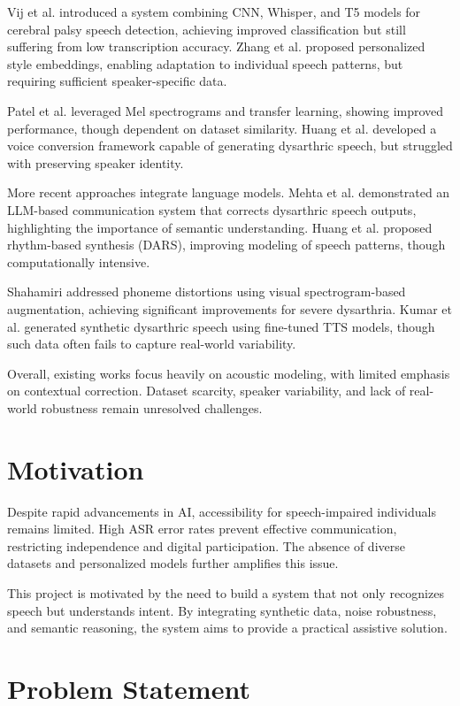 Vij et al. introduced a system combining CNN, Whisper, and T5 models for cerebral palsy speech detection, achieving improved classification but still suffering from low transcription accuracy. Zhang et al. proposed personalized style embeddings, enabling adaptation to individual speech patterns, but requiring sufficient speaker-specific data.

Patel et al. leveraged Mel spectrograms and transfer learning, showing improved performance, though dependent on dataset similarity. Huang et al. developed a voice conversion framework capable of generating dysarthric speech, but struggled with preserving speaker identity.

More recent approaches integrate language models. Mehta et al. demonstrated an LLM-based communication system that corrects dysarthric speech outputs, highlighting the importance of semantic understanding. Huang et al. proposed rhythm-based synthesis (DARS), improving modeling of speech patterns, though computationally intensive.

Shahamiri addressed phoneme distortions using visual spectrogram-based augmentation, achieving significant improvements for severe dysarthria. Kumar et al. generated synthetic dysarthric speech using fine-tuned TTS models, though such data often fails to capture real-world variability.

Overall, existing works focus heavily on acoustic modeling, with limited emphasis on contextual correction. Dataset scarcity, speaker variability, and lack of real-world robustness remain unresolved challenges.

\section{\textbf{Motivation}}

Despite rapid advancements in AI, accessibility for speech-impaired individuals remains limited. High ASR error rates prevent effective communication, restricting independence and digital participation. The absence of diverse datasets and personalized models further amplifies this issue.

This project is motivated by the need to build a system that not only recognizes speech but understands intent. By integrating synthetic data, noise robustness, and semantic reasoning, the system aims to provide a practical assistive solution.

\section{\textbf{Problem Statement}}

